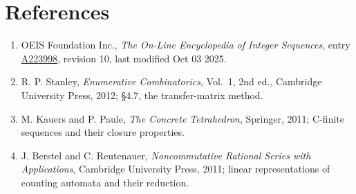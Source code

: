 \documentclass[11pt]{article}
\theoremstyle{definition}
\begin{document}
\section{References}

\begin{enumerate}

\item OEIS Foundation Inc., \emph{The On-Line Encyclopedia of Integer Sequences}, entry \href{https://oeis.org/A223998}{A223998}, revision 10, last modified Oct 03 2025.

\item R. P. Stanley, \emph{Enumerative Combinatorics}, Vol.~1, 2nd ed., Cambridge University Press, 2012; \S4.7, the transfer-matrix method.

\item M. Kauers and P. Paule, \emph{The Concrete Tetrahedron}, Springer, 2011; C-finite sequences and their closure properties.

\item J. Berstel and C. Reutenauer, \emph{Noncommutative Rational Series with Applications}, Cambridge University Press, 2011; linear representations of counting automata and their reduction.

\end{enumerate}
\end{document}

